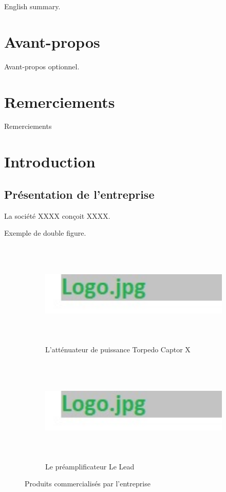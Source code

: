 \documentclass[a4paper]{article}
\begin{document}
English summary.

\newpage
\section*{Avant-propos}

Avant-propos optionnel.

\newpage
\section*{Remerciements}

Remerciements

\newpage
\begingroup
{}
\thispagestyle{empty}
\tableofcontents
\thispagestyle{empty}
\endgroup

\newpage
\section{Introduction}
\subsection{Présentation de l'entreprise}

La société XXXX conçoit XXXX.

Exemple de double figure.

\begin{figure}[H]
    \centering
    \begin{subfigure}{.49\textwidth}
        \centering
        \includegraphics[width=\linewidth, height=5cm, keepaspectratio]{../img/logo}
        \caption{L'atténuateur de puissance Torpedo Captor X}
        \label{img:logo2}
    \end{subfigure}
    \begin{subfigure}{.49\textwidth}
        \centering
        \includegraphics[width=\linewidth, height=5cm, keepaspectratio]{../img/logo}
        \caption{Le préamplificateur Le Lead}
        \label{img:logo3}
    \end{subfigure}
    \caption{Produits commercialisés par l'entreprise}
    \label{img:logo}
\end{figure}
\end{document}
